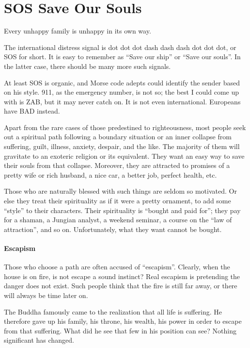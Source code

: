 \section{SOS Save Our Souls}

\begin{quotex}
Every unhappy family is unhappy in its own way. 
\end{quotex}


The international distress signal is dot dot dot dash dash dash dot dot dot, or SOS for short. It is easy to remember as ``Save our ship'' or ``Save our souls''. In the latter case, there should be many more such signals.

At least SOS is organic, and Morse code adepts could identify the sender based on his style. 911, as the emergency number, is not so; the best I could come up with is ZAB, but it may never catch on. It is not even international. Europeans have BAD instead.

Apart from the rare cases of those predestined to righteousness, most people seek out a spiritual path following a boundary situation or an inner collapse from suffering, guilt, illness, anxiety, despair, and the like. The majority of them will gravitate to an exoteric religion or its equivalent. They want an easy way to save their souls from that collapse. Moreover, they are attracted to promises of a pretty wife or rich husband, a nice car, a better job, perfect health, etc.

Those who are naturally blessed with such things are seldom so motivated. Or else they treat their spirituality as if it were a pretty ornament, to add some ``style'' to their characters. Their spirituality is ``bought and paid for''; they pay for a shaman, a Jungian analyst, a weekend seminar, a course on the ``law of attraction'', and so on. Unfortunately, what they want cannot be bought.

\paragraph{Escapism}


Those who choose a path are often accused of ``escapism''. Clearly, when the house is on fire, is not escape a sound instinct? Real escapism is pretending the danger does not exist. Such people think that the fire is still far away, or there will always be time later on.

The Buddha famously came to the realization that all life is suffering. He therefore gave up his family, his throne, his wealth, his power in order to escape from that suffering. What did he see that few in his position can see? Nothing significant has changed.

